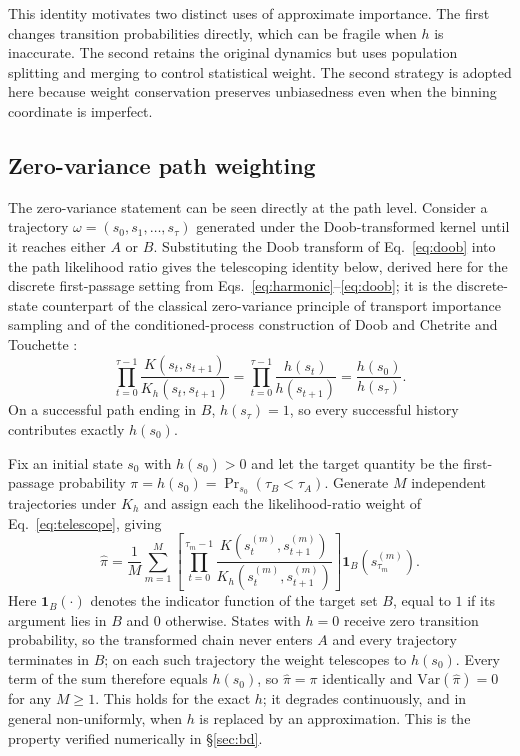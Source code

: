 \documentclass[a4paper,fleqn]{cas-sc}
\begin{document}
This identity motivates two distinct uses of approximate importance. The first changes
transition probabilities directly, which can be fragile when $h$ is inaccurate. The second
retains the original dynamics but uses population splitting and merging to control
statistical weight. The second strategy is adopted here because weight conservation
preserves unbiasedness even when the binning coordinate is imperfect.

\subsection{Zero-variance path weighting}\label{sec:zerovar}
The zero-variance statement can be seen directly at the path level. Consider a trajectory
$\omega=(s_0,s_1,\dots,s_\tau)$ generated under the Doob-transformed kernel until it reaches
either $A$ or $B$. Substituting the Doob transform of Eq.~\eqref{eq:doob} into the path
likelihood ratio gives the telescoping identity below, derived here for the discrete
first-passage setting from Eqs.~\eqref{eq:harmonic}--\eqref{eq:doob}; it is the discrete-state
counterpart of the classical zero-variance principle of transport importance sampling
\citep{lewins1965,spanier1969,haghighat2003} and of the conditioned-process construction of
Doob \citep{doob1984} and Chetrite and Touchette \citep{chetrite2015}:
\begin{equation}
\prod_{t=0}^{\tau-1}\frac{K(s_t,s_{t+1})}{K_h(s_t,s_{t+1})}
=\prod_{t=0}^{\tau-1}\frac{h(s_t)}{h(s_{t+1})}
=\frac{h(s_0)}{h(s_\tau)} .
\label{eq:telescope}
\end{equation}
On a successful path ending in $B$, $h(s_\tau)=1$, so every successful history contributes
exactly $h(s_0)$.

Fix an initial state $s_0$ with $h(s_0)>0$ and let the target quantity be the first-passage
probability $\pi=h(s_0)=\Pr_{s_0}(\tau_B<\tau_A)$. Generate $M$ independent trajectories under
$K_h$ and assign each the likelihood-ratio weight of Eq.~\eqref{eq:telescope}, giving
\begin{equation}
\hat\pi=\frac1M\sum_{m=1}^{M}
\left[\prod_{t=0}^{\tau_m-1}\frac{K(s_t^{(m)},s_{t+1}^{(m)})}{K_h(s_t^{(m)},s_{t+1}^{(m)})}\right]
\mathbf 1_B\!\left(s_{\tau_m}^{(m)}\right).
\label{eq:zvest}
\end{equation}
Here $\mathbf 1_B(\cdot)$ denotes the indicator function of the target set $B$, equal to $1$ if
its argument lies in $B$ and $0$ otherwise.
States with $h=0$ receive zero transition probability, so the transformed chain never enters
$A$ and every trajectory terminates in $B$; on each such trajectory the weight telescopes to
$h(s_0)$. Every term of the sum therefore equals $h(s_0)$, so $\hat\pi=\pi$ identically and
$\mathrm{Var}(\hat\pi)=0$ for any $M\ge1$. This holds for the exact $h$; it degrades
continuously, and in general non-uniformly, when $h$ is replaced by an approximation. This is
the property verified numerically in \S\ref{sec:bd}.
\end{document}
